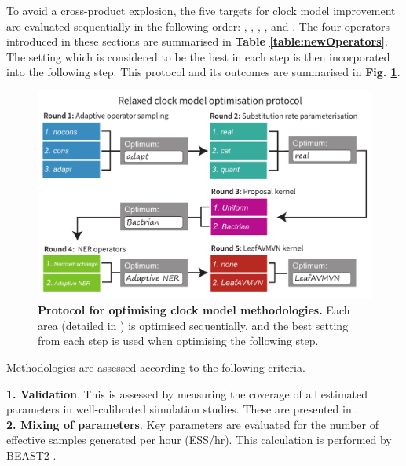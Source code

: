 \documentclass[10pt,letterpaper]{article}
\begin{document}


To avoid a cross-product explosion, the five targets for clock model improvement are evaluated sequentially in the following order: \textbf{}, \textbf{}, \textbf{}, \textbf{}, and \textbf{}.
The four operators introduced in these sections are summarised in \textbf{Table \ref{table:newOperators}}.
The setting which is considered to be the best in each step is then incorporated into the following step. This protocol and its outcomes are summarised in \textbf{Fig. \ref{fig:tournament}}.





\begin{figure}[!h]
\includegraphics[width=\textwidth]{Figures/tournament.pdf}
\caption{\textbf{Protocol for optimising clock model methodologies.} Each area (detailed in \textbf{}) is optimised sequentially, and the best setting from each step is used when optimising the following step.}
\label{fig:tournament}
\end{figure}


Methodologies are assessed according to the following criteria.


\textbf{1. Validation}. This is assessed by measuring the coverage of all estimated parameters in well-calibrated simulation studies. These are presented in \textbf{}. \\


\textbf{2. Mixing of parameters}. Key parameters are evaluated for the number of effective samples generated per hour (ESS/hr). 
This calculation is performed by BEAST2 \cite{bouckaert2019beast}. \\
\end{document}
